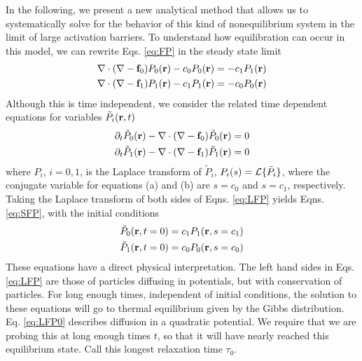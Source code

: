 \documentclass[journal = mamobx, manuscript = article]{achemso}
\def\br{{\bf r}}
\def\bof{{\bf f}}
\begin{document}
In the following, we present a new analytical method that allows us to systematically solve for the behavior of this kind of nonequilibrium system in the limit of large activation barriers. To understand how equilibration can occur in this model, we can rewrite 
Eqs. \ref{eq:FP} in the steady state limit
\begin{subequations}
\label{eq:SFP}
\begin{align}
\nabla \cdot (\nabla - \bof_0)P_0(\br) - c_0 P_0(\br) = -c_1 P_1(\br)\label{eq:SFP0}\\
\nabla \cdot (\nabla - \bof_1)P_1(\br) - c_1 P_1(\br) = -c_0 P_0(\br) \label{eq:SFP1}
\end{align}
\end{subequations}
Although this is time independent, we consider the related time dependent equations for
variables $\tilde{P}_i(\br, t)$
\begin{subequations}
\label{eq:LFP}
\begin{align}
 \partial_t \tilde{P}_0(\br)-\nabla \cdot (\nabla - \bof_0)\tilde{P}_0(\br)  = 0 \label{eq:LFP0}\\
 \partial_t  \tilde{P}_1(\br)-\nabla \cdot (\nabla - \bof_1)\tilde{P}_1(\br)  = 0 \label{eq:LFP1}
\end{align}
\end{subequations}
where $P_i$, $i=0,1$, is the Laplace transform of $\tilde{P}_i$, $P_i(s) = {\cal L} \{\tilde{P}_i\}$, where the conjugate variable
for equations (a) and (b) are $s =c_0$ and $s = c_1$, respectively. Taking the Laplace transform of both sides of Eqns. \ref{eq:LFP} yields Eqns. \ref{eq:SFP}, with the initial conditions 
\begin{subequations}
\label{eq:IFP}
\begin{align}
\tilde{P}_0(\br,t=0) = c_1 P_1(\br,s=c_1) \label{eq:IFP0}\\
\tilde{P}_1(\br,t=0) = c_0 P_0(\br,s=c_0) \label{eq:IFP1}
\end{align}
\end{subequations}
These equations have a direct physical interpretation. The left hand sides in
Eqs. \ref{eq:LFP} are those of particles diffusing in potentials, but with
conservation of particles. For long enough times, independent of initial
conditions, the solution to these equations will go to thermal equilibrium given
by the Gibbs distribution. 
Eq. \ref{eq:LFP0} describes diffusion in a quadratic potential. We require that
we are probing this at long enough times $t$, so that it will have nearly
reached this equilibrium state. Call this longest relaxation time $\tau_0$.
\end{document}
